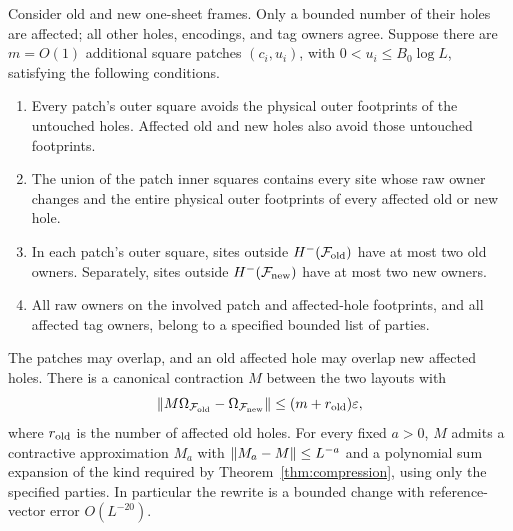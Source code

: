\begin{lemma}\label{lem:small-rewrite}
Consider old and new one-sheet frames.  Only a bounded number of their holes
are affected; all other holes, encodings, and tag owners agree.  Suppose
there are $m=O(1)$ additional square patches $(c_i,u_i)$, with
$0<u_i\le B_0\log L$, satisfying the following conditions.
\begin{enumerate}
\item Every patch's outer square avoids the physical outer footprints of
the untouched holes.  Affected old and new holes also avoid those
untouched footprints.
\item The union of the patch inner squares contains every site whose raw
owner changes and the entire physical outer footprints of every affected
old or new hole.
\item In each patch's outer square, sites outside $H^-(\mathcal F_{\rm old})$
have at most two old owners.  Separately, sites outside
$H^-(\mathcal F_{\rm new})$ have at most two new owners.
\item All raw owners on the involved patch and affected-hole footprints,
and all affected tag owners, belong to a specified bounded list of parties.
\end{enumerate}
The patches may overlap, and an old affected hole may overlap new affected
holes.  There is a canonical contraction $M$ between the two layouts with
\begin{equation}\label{eq:rewrite-reference-error}
 \lVert M\Omega_{\mathcal F_{\rm old}}-
                   \Omega_{\mathcal F_{\rm new}}\rVert
       \le(m+r_{\rm old})\varepsilon,
\end{equation}
where $r_{\rm old}$ is the number of affected old holes.  For every fixed
$a>0$, $M$ admits a contractive approximation $M_a$ with
$\lVert M_a-M\rVert\le L^{-a}$ and a polynomial sum expansion of the kind required
by Theorem~\ref{thm:compression}, using only the specified parties.  In
particular the rewrite is a bounded change with reference-vector error
$O(L^{-20})$.
\end{lemma}

